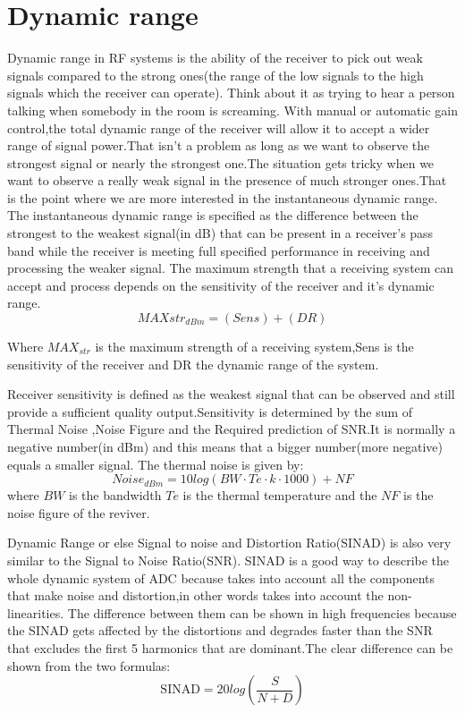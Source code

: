 \section{Dynamic range}
Dynamic range in RF systems is the ability of the receiver to pick out weak signals compared to the strong ones(the range of the low signals to the high signals which the receiver can operate). Think about it as trying to hear a person talking when somebody in the room is screaming.  
With manual or automatic gain control,the total dynamic range of the receiver will allow it to accept a wider range of signal power.That isn't a problem as long as we want to observe the strongest signal or nearly the strongest one.The situation gets tricky when we want to observe a really weak signal in the presence of much stronger ones.That is the point where we are more interested in the instantaneous dynamic range.
The instantaneous dynamic range is specified as the difference between the strongest to the weakest signal(in dB) that can be present in a receiver's pass band while the receiver is meeting full specified performance in receiving and processing the weaker signal.
The maximum strength that a receiving system can accept and process depends on the sensitivity of the receiver and it's dynamic range.
\begin{equation}
MAXstr_{dBm} = (Sens) +(DR)
\label{Max strength of a receiving system}
\end{equation}

Where $MAX_{str}$ is the maximum strength of a receiving system,Sens is the sensitivity of the receiver and DR the dynamic range of the system.\citep{DyR}

Receiver sensitivity is defined as the weakest signal that can be observed and still provide a sufficient quality output.Sensitivity is determined by the sum of Thermal Noise ,Noise Figure and the Required prediction of SNR.It is normally a negative number(in dBm) and this means that a bigger number(more negative) equals a smaller signal.
The thermal noise is given by:
\begin{equation}
Noise_{dBm} = 10log(BW\cdot Te\cdot k\cdot 1000) + NF
\label{Noise1}
\end{equation}
where $BW$ is the bandwidth $Te$ is the thermal temperature and the $NF$ is the noise figure of the reviver.

Dynamic Range or else Signal to noise and Distortion Ratio(SINAD) is also very similar to the Signal to Noise Ratio(SNR). SINAD is a good way to describe the whole dynamic system of ADC because takes into account all the components that make noise and distortion,in other words takes into account the non-linearities. The difference between them can be shown in high frequencies because the SINAD gets affected by the distortions and degrades faster than the SNR that excludes the first 5 harmonics that are dominant.The clear difference can be shown from the two formulas:
\begin{equation}
\text{SINAD} = 20log\left(\frac{S}{N+D}\right)
\end{equation}

